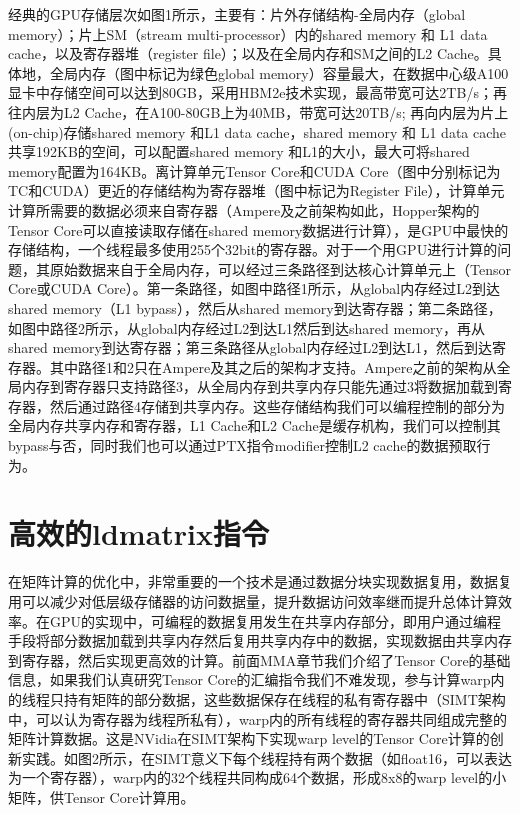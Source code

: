 经典的GPU存储层次如图1所示，主要有：片外存储结构-全局内存（global memory）；片上SM（stream multi-processor）内的shared  memory 和 L1 data cache，以及寄存器堆（register file）；以及在全局内存和SM之间的L2 Cache。具体地，全局内存（图中标记为绿色global memory）容量最大，在数据中心级A100显卡中存储空间可以达到80GB，采用HBM2e技术实现，最高带宽可达2TB/s；再往内层为L2 Cache，在A100-80GB上为40MB，带宽可达20TB/s; 再向内层为片上(on-chip)存储shared memory 和L1 data cache，shared memory 和 L1 data cache 共享192KB的空间，可以配置shared memory 和L1的大小，最大可将shared memory配置为164KB。离计算单元Tensor Core和CUDA Core（图中分别标记为TC和CUDA）更近的存储结构为寄存器堆（图中标记为Register File），计算单元计算所需要的数据必须来自寄存器（Ampere及之前架构如此，Hopper架构的Tensor Core可以直接读取存储在shared memory数据进行计算），是GPU中最快的存储结构，一个线程最多使用255个32bit的寄存器。对于一个用GPU进行计算的问题，其原始数据来自于全局内存，可以经过三条路径到达核心计算单元上（Tensor Core或CUDA Core）。第一条路径，如图中路径1所示，从global内存经过L2到达shared memory（L1 bypass），然后从shared memory到达寄存器；第二条路径，如图中路径2所示，从global内存经过L2到达L1然后到达shared memory，再从shared memory到达寄存器；第三条路径从global内存经过L2到达L1，然后到达寄存器。其中路径1和2只在Ampere及其之后的架构才支持。Ampere之前的架构从全局内存到寄存器只支持路径3，从全局内存到共享内存只能先通过3将数据加载到寄存器，然后通过路径4存储到共享内存。这些存储结构我们可以编程控制的部分为全局内存共享内存和寄存器，L1 Cache和L2 Cache是缓存机构，我们可以控制其bypass与否，同时我们也可以通过PTX指令modifier控制L2 cache的数据预取行为。

\section{高效的ldmatrix指令}

在矩阵计算的优化中，非常重要的一个技术是通过数据分块实现数据复用，数据复用可以减少对低层级存储器的访问数据量，提升数据访问效率继而提升总体计算效率。在GPU的实现中，可编程的数据复用发生在共享内存部分，即用户通过编程手段将部分数据加载到共享内存然后复用共享内存中的数据，实现数据由共享内存到寄存器，然后实现更高效的计算。前面MMA章节我们介绍了Tensor Core的基础信息，如果我们认真研究Tensor Core的汇编指令我们不难发现，参与计算warp内的线程只持有矩阵的部分数据，这些数据保存在线程的私有寄存器中（SIMT架构中，可以认为寄存器为线程所私有），warp内的所有线程的寄存器共同组成完整的矩阵计算数据。这是NVidia在SIMT架构下实现warp level的Tensor Core计算的创新实践。如图2所示，在SIMT意义下每个线程持有两个数据（如float16，可以表达为一个寄存器），warp内的32个线程共同构成64个数据，形成8x8的warp level的小矩阵，供Tensor Core计算用。


